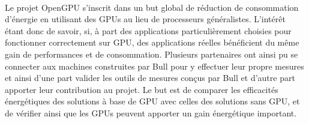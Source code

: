 \documentclass[11pt]{article}
\begin{document}
				\paragraph{}
				Le projet OpenGPU s'inscrit dans un but global de réduction de consommation d’énergie en utilisant des GPUs 
				au lieu de processeurs généralistes. L'intérêt étant donc de savoir, si, à part des applications particulièrement 
				choisies pour fonctionner correctement sur GPU, des applications réelles bénéficient du même gain de performances 
				et de consommation. \newline
				Plusieurs partenaires ont ainsi pu se connecter aux machines construites par Bull pour y effectuer leur propre 
				mesures et ainsi d'une part valider les outils de mesures conçus par Bull et d'autre part apporter leur contribution 
				au projet. \newline
				Le but est de comparer les efficacités énergétiques des solutions à base de GPU avec celles des solutions sans 
				GPU, et de vérifier ainsi que les GPUs peuvent apporter un gain énergétique important.
\end{document}
